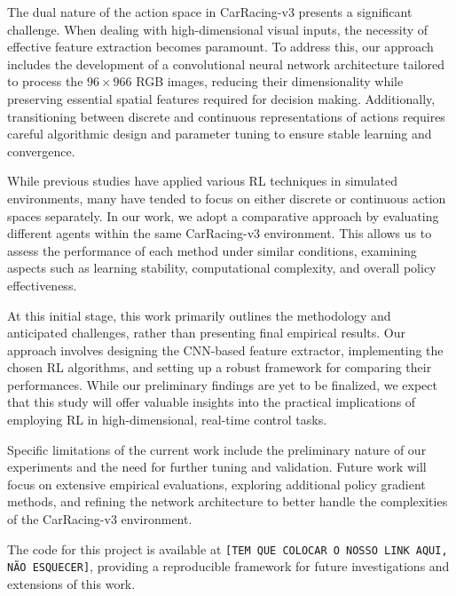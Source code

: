\documentclass[../CSC_52081_EP.tex]{subfiles}
\begin{document}
The dual nature of the action space in CarRacing-v3 presents a significant challenge. When dealing with high-dimensional visual inputs, the necessity of effective feature extraction becomes paramount. To address this, our approach includes the development of a convolutional neural network architecture tailored to process the \(96\times96\)6 RGB images, reducing their dimensionality while preserving essential spatial features required for decision making. Additionally, transitioning between discrete and continuous representations of actions requires careful algorithmic design and parameter tuning to ensure stable learning and convergence.

While previous studies have applied various RL techniques in simulated environments, many have tended to focus on either discrete or continuous action spaces separately. In our work, we adopt a comparative approach by evaluating different agents within the same CarRacing-v3 environment. This allows us to assess the performance of each method under similar conditions, examining aspects such as learning stability, computational complexity, and overall policy effectiveness.

At this initial stage, this work primarily outlines the methodology and anticipated challenges, rather than presenting final empirical results. Our approach involves designing the CNN-based feature extractor, implementing the chosen RL algorithms, and setting up a robust framework for comparing their performances. While our preliminary findings are yet to be finalized, we expect that this study will offer valuable insights into the practical implications of employing RL in high-dimensional, real-time control tasks.

Specific limitations of the current work include the preliminary nature of our experiments and the need for further tuning and validation. Future work will focus on extensive empirical evaluations, exploring additional policy gradient methods, and refining the network architecture to better handle the complexities of the CarRacing-v3 environment.

The code for this project is available at \texttt{[TEM QUE COLOCAR O NOSSO LINK AQUI, NÃO ESQUECER]}, providing a reproducible framework for future investigations and extensions of this work.
\end{document}
